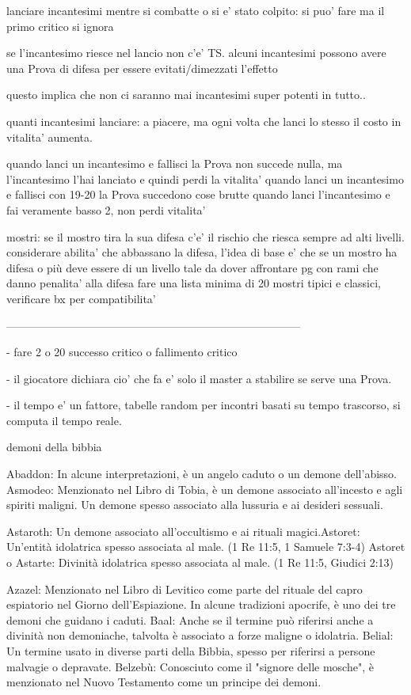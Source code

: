 \documentclass[12pt,a4paper,twoside,openany]{book}
\begin{document}
lanciare incantesimi mentre si combatte o si e' stato colpito: si puo' fare ma il primo critico si ignora

se l'incantesimo riesce nel lancio non c'e' TS. alcuni incantesimi possono avere una Prova di difesa per essere evitati/dimezzati l'effetto

questo implica che non ci saranno mai incantesimi super potenti in tutto..

quanti incantesimi lanciare:  a piacere, ma ogni volta che lanci lo stesso il costo in vitalita' aumenta. 

quando lanci un incantesimo e fallisci la Prova non succede nulla, ma l'incantesimo l'hai lanciato e quindi perdi la vitalita' 
quando lanci un incantesimo e fallisci con 19-20 la Prova succedono cose  brutte
quando lanci l'incantesimo e fai veramente basso 2, non perdi vitalita'


mostri:
se il mostro tira la sua difesa c'e' il rischio che riesca sempre ad alti livelli. considerare abilita' che abbassano la difesa, l'idea di base e' che se un mostro ha difesa  o più deve essere di un livello tale da dover affrontare pg con rami che danno penalita' alla difesa
fare una lista minima di 20 mostri tipici e classici, verificare bx per compatibilita'


--------------------------------------------------------------------------------



- fare 2 o 20  successo critico o fallimento  critico

- il giocatore dichiara cio' che fa e' solo il master a stabilire se serve una Prova. 

- il tempo e' un fattore, tabelle random per incontri basati su tempo trascorso, si computa il tempo reale.



demoni della bibbia

Abaddon: In alcune interpretazioni, è un angelo caduto o un demone dell'abisso.
Asmodeo: Menzionato nel Libro di Tobia, è un demone associato all'incesto e agli spiriti maligni. Un demone spesso associato alla lussuria e ai desideri sessuali.

Astaroth: Un demone associato all'occultismo e ai rituali magici.Astoret: Un'entità idolatrica spesso associata al male. (1 Re 11:5, 1 Samuele 7:3-4)
Astoret o Astarte: Divinità idolatrica spesso associata al male. (1 Re 11:5, Giudici 2:13)



Azazel: Menzionato nel Libro di Levitico come parte del rituale del capro espiatorio nel Giorno dell'Espiazione. In alcune tradizioni apocrife, è uno dei tre demoni che guidano i caduti.
Baal: Anche se il termine può riferirsi anche a divinità non demoniache, talvolta è associato a forze maligne o idolatria.
Belial: Un termine usato in diverse parti della Bibbia, spesso per riferirsi a persone malvagie o depravate.
Belzebù: Conosciuto come il "signore delle mosche", è menzionato nel Nuovo Testamento come un principe dei demoni.
\end{document}
